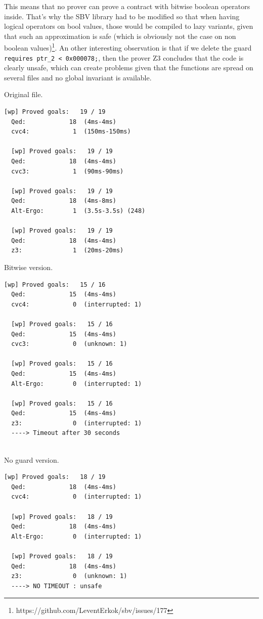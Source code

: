 \documentclass[a4paper,11pt,final]{article}
\begin{document}
  This means that no prover can prove a contract with bitwise boolean operators inside. That's why the SBV library had to be modified so that when having logical operators on bool values, those would be compiled to lazy variants, given that such an approximation is safe (which is obviously not the case on non boolean values)\footnote{https://github.com/LeventErkok/sbv/issues/177}. An other interesting observation is that if we delete the guard \texttt{requires ptr\_2 < 0x000078;}, then the prover Z3 concludes that the code is clearly unsafe, which can create problems given that the functions are spread on several files and no global invariant is available. 
  
  \begin{multicols}{3}
  Original file.
  \begin{lstlisting}[basicstyle=\tiny]
  [wp] Proved goals:   19 / 19
  Qed:            18  (4ms-4ms)
  cvc4:            1  (150ms-150ms)
  
  [wp] Proved goals:   19 / 19
  Qed:            18  (4ms-4ms)
  cvc3:            1  (90ms-90ms)
  
  [wp] Proved goals:   19 / 19
  Qed:            18  (4ms-8ms)
  Alt-Ergo:        1  (3.5s-3.5s) (248)
  
  [wp] Proved goals:   19 / 19
  Qed:            18  (4ms-4ms)
  z3:              1  (20ms-20ms)
  \end{lstlisting}
  \columnbreak
  Bitwise version.
  \begin{lstlisting}[basicstyle=\tiny]
  [wp] Proved goals:   15 / 16
  Qed:            15  (4ms-4ms)
  cvc4:            0  (interrupted: 1)
  
  [wp] Proved goals:   15 / 16
  Qed:            15  (4ms-4ms)
  cvc3:            0  (unknown: 1)
  
  [wp] Proved goals:   15 / 16
  Qed:            15  (4ms-4ms)
  Alt-Ergo:        0  (interrupted: 1)
  
  [wp] Proved goals:   15 / 16
  Qed:            15  (4ms-4ms)
  z3:              0  (interrupted: 1)    
  ----> Timeout after 30 seconds
  
  \end{lstlisting}
  \columnbreak
  No guard version.
  \begin{lstlisting}[basicstyle=\tiny]
  [wp] Proved goals:   18 / 19
  Qed:            18  (4ms-4ms)
  cvc4:            0  (interrupted: 1)
  
  [wp] Proved goals:   18 / 19
  Qed:            18  (4ms-4ms)
  Alt-Ergo:        0  (interrupted: 1)
  
  [wp] Proved goals:   18 / 19
  Qed:            18  (4ms-4ms)
  z3:              0  (unknown: 1)   
  ----> NO TIMEOUT : unsafe
  \end{lstlisting}
  \end{multicols}
  
\end{document}

